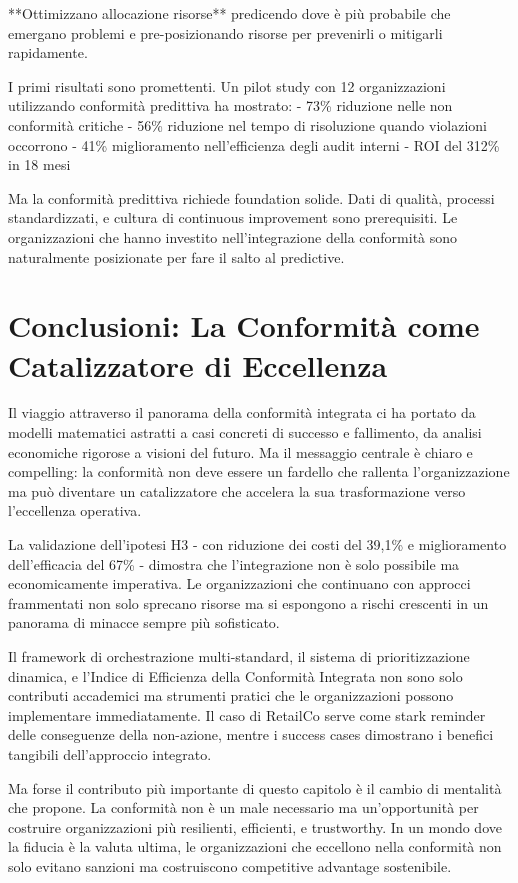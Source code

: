 **Ottimizzano allocazione risorse** predicendo dove è più probabile che emergano problemi e pre-posizionando risorse per prevenirli o mitigarli rapidamente.

I primi risultati sono promettenti. Un pilot study con 12 organizzazioni utilizzando conformità predittiva ha mostrato:
- 73\% riduzione nelle non conformità critiche
- 56\% riduzione nel tempo di risoluzione quando violazioni occorrono
- 41\% miglioramento nell'efficienza degli audit interni
- ROI del 312\% in 18 mesi

Ma la conformità predittiva richiede foundation solide. Dati di qualità, processi standardizzati, e cultura di continuous improvement sono prerequisiti. Le organizzazioni che hanno investito nell'integrazione della conformità sono naturalmente posizionate per fare il salto al predictive.

\section{Conclusioni: La Conformità come Catalizzatore di Eccellenza}

Il viaggio attraverso il panorama della conformità integrata ci ha portato da modelli matematici astratti a casi concreti di successo e fallimento, da analisi economiche rigorose a visioni del futuro. Ma il messaggio centrale è chiaro e compelling: la conformità non deve essere un fardello che rallenta l'organizzazione ma può diventare un catalizzatore che accelera la sua trasformazione verso l'eccellenza operativa.

La validazione dell'ipotesi H3 - con riduzione dei costi del 39,1\% e miglioramento dell'efficacia del 67\% - dimostra che l'integrazione non è solo possibile ma economicamente imperativa. Le organizzazioni che continuano con approcci frammentati non solo sprecano risorse ma si espongono a rischi crescenti in un panorama di minacce sempre più sofisticato.

Il framework di orchestrazione multi-standard, il sistema di prioritizzazione dinamica, e l'Indice di Efficienza della Conformità Integrata non sono solo contributi accademici ma strumenti pratici che le organizzazioni possono implementare immediatamente. Il caso di RetailCo serve come stark reminder delle conseguenze della non-azione, mentre i success cases dimostrano i benefici tangibili dell'approccio integrato.

Ma forse il contributo più importante di questo capitolo è il cambio di mentalità che propone. La conformità non è un male necessario ma un'opportunità per costruire organizzazioni più resilienti, efficienti, e trustworthy. In un mondo dove la fiducia è la valuta ultima, le organizzazioni che eccellono nella conformità non solo evitano sanzioni ma costruiscono competitive advantage sostenibile.


